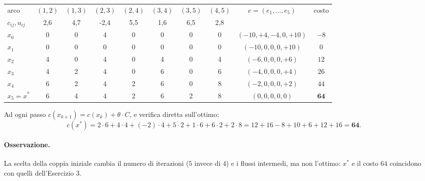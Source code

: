\documentclass[11pt,a4paper]{article}
\begin{document}
\begin{sol}
\begin{center}\small
\begin{tabular}{@{}lccccccc|cc@{}}
\toprule
arco & $(1,2)$ & $(1,3)$ & $(2,3)$ & $(2,4)$ & $(3,4)$ & $(3,5)$ & $(4,5)$ & $e=(e_1,\dots,e_5)$ & costo\\
$c_{ij},u_{ij}$ & 2,6 & 4,7 & -2,4 & 5,5 & 1,6 & 6,5 & 2,8 & & \\
\midrule
$x_0$ & 0 & 0 & 4 & 0 & 0 & 0 & 0 & $(-10,+4,-4,0,+10)$ & $-8$\\
$x_1$ & 0 & 0 & 0 & 0 & 0 & 0 & 0 & $(-10,0,0,0,+10)$ & $0$\\
$x_2$ & 4 & 0 & 4 & 0 & 4 & 0 & 4 & $(-6,0,0,0,+6)$ & $12$\\
$x_3$ & 4 & 2 & 4 & 0 & 6 & 0 & 6 & $(-4,0,0,0,+4)$ & $26$\\
$x_4$ & 6 & 2 & 4 & 2 & 6 & 0 & 8 & $(-2,0,0,0,+2)$ & $44$\\
$x_5=x^\ast$ & 6 & 4 & 4 & 2 & 6 & 2 & 8 & $(0,0,0,0,0)$ & $\mathbf{64}$\\
\bottomrule
\end{tabular}
\end{center}

\noindent Ad ogni passo $c(x_{k+1})=c(x_k)+\theta\cdot C$, e verifica diretta sull'ottimo:
\[
 c(x^\ast)=2\cdot6+4\cdot4+(-2)\cdot4+5\cdot2+1\cdot6+6\cdot2+2\cdot8
 =12+16-8+10+6+12+16=\mathbf{64}.
\]

\begin{center}
\end{center}

\paragraph{Osservazione.} La scelta della coppia iniziale cambia il numero di iterazioni
($5$ invece di $4$) e i flussi intermedi, ma non l'ottimo: $x^\ast$ e il costo $64$ coincidono
con quelli dell'Esercizio 3.
\end{sol}
\end{document}
